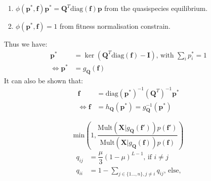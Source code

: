 \documentclass[8pt]{beamer}
\begin{document}
	\begin{frame}
		\vspace*{3cm}
		\begin{enumerate}
			\addtolength{\itemindent}{1.5cm}
			\item $\phi(\mathbf{p}^*, \mathbf{f}) \mathbf{p}^* = \mathbf{Q}^T \mathrm{diag}(\mathbf{f}) \mathbf{p}$ from the quasispecies equilibrium.
			\item $\phi(\mathbf{p}^*, \mathbf{f}) = 1$ from fitness normalisation constrain.
		\end{enumerate}
		\hspace*{1cm} Thus we have:
		\begin{align*}
		 \mathbf{p}^* &= \ker(\mathbf{Q}^T \mathrm{diag}(\mathbf{f}) -\mathbf{I}) \text{, with }\sum_i p_i^* = 1 \\
		 \iff \mathbf{p}^*&= g_{\mathbf{Q}}(\mathbf{f})
		\end{align*}
		\hspace*{1cm}It can also be shown that:
		\begin{align*}
		\mathbf{f} &= \mathrm{diag}(\mathbf{p}^*)^{-1} \left(\mathbf{Q}^T \right)^{-1}  \mathbf{p}^*
		\\
		\iff \mathbf{f} &= h_{\mathbf{Q}}(\mathbf{p}^*) = g_{\mathbf{Q}}^{-1}(\mathbf{p}^*)
		\end{align*}
		\vspace*{6cm}
	\end{frame}
	\begin{frame}
		\begin{equation*}
			\mathrm{min} \left(1, \dfrac{\mathrm{Mult}(\mathbf{X} |g_{\mathbf{Q}}(\mathbf{f'})) p(\mathbf{f'})}{\mathrm{Mult}(\mathbf{X} |g_{\mathbf{Q}}(\mathbf{f})) p(\mathbf{f})}\right)
		\end{equation*}
		\begin{align*}
		q_{ij} &= \dfrac{\mu}{3} \left(1 - \mu \right)^{L-1} \text{, if } i \neq j \\
		q_{ii} &= 1 - \sum_{j \in \{1 \dots, n\}, j \neq i} q_{ij} \text{, else,}
		\end{align*}
	\end{frame}
\end{document}
